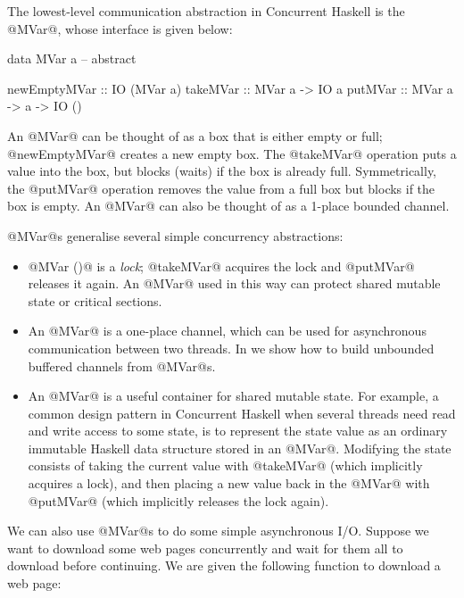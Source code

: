 
The lowest-level communication abstraction in Concurrent Haskell is
the @MVar@, whose interface is given below:

\begin{haskell}
data MVar a  -- abstract

newEmptyMVar :: IO (MVar a)
takeMVar     :: MVar a -> IO a
putMVar      :: MVar a -> a -> IO ()
\end{haskell}

\noindent An @MVar@ can be thought of as a box that is either empty
or full; @newEmptyMVar@ creates a new empty box.  The @takeMVar@
operation puts a value into the box, but blocks (waits) if the box is
already full.  Symmetrically, the @putMVar@ operation removes the value
from a full box but blocks if the box is empty.  An @MVar@ can also be
thought of as a 1-place bounded channel.

@MVar@s generalise several simple concurrency abstractions:

\begin{itemize}
\item @MVar ()@ is a \emph{lock}; @takeMVar@ acquires the lock and
  @putMVar@ releases it again.  An @MVar@ used in this way can protect
  shared mutable state or critical sections.

\item An @MVar@ is a one-place channel, which can be used for
  asynchronous communication between two threads.  In
   we show how to build unbounded buffered channels
  from @MVar@s.

\item An @MVar@ is a useful container for shared mutable state.  For
  example, a common design pattern in Concurrent Haskell when several
  threads need read and write access to some state, is to represent
  the state value as an ordinary immutable Haskell data structure
  stored in an @MVar@.  Modifying the state consists of taking the
  current value with @takeMVar@ (which implicitly acquires a lock),
  and then placing a new value back in the @MVar@ with @putMVar@
  (which implicitly releases the lock again).

\end{itemize}

We can also use @MVar@s to do some simple asynchronous I/O.  Suppose
we want to download some web pages concurrently and wait for them all
to download before continuing.  We are given the following function to
download a web page:

